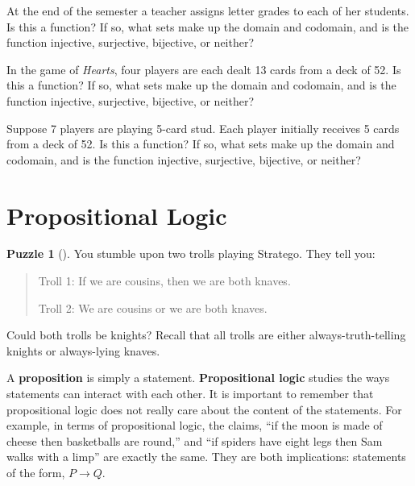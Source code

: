 \documentclass[10pt,]{book}
\newcommand{\terminology}[1]{\textbf{#1}}
\theoremstyle{plain}
\theoremstyle{definition}
\theoremstyle{definition}
\theoremstyle{definition}
\newtheorem{investigation}[project]{Puzzle}
\numberwithin{equation}{chapter}
\def\imp{\rightarrow}
\begin{document}
\begin{divisionexercise}{15}\hypertarget{exercise-148}{}
\hypertarget{p-2007}{}%
At the end of the semester a teacher assigns letter grades to each of her students. Is this a function? If so, what sets make up the domain and codomain, and is the function injective, surjective, bijective, or neither?%
\end{divisionexercise}%
\begin{divisionexercise}{16}\hypertarget{exercise-149}{}
\hypertarget{p-2009}{}%
In the game of \emph{Hearts}, four players are each dealt 13 cards from a deck of 52. Is this a function? If so, what sets make up the domain and codomain, and is the function injective, surjective, bijective, or neither?%
\end{divisionexercise}%
\begin{divisionexercise}{17}\hypertarget{exercise-150}{}
\hypertarget{p-2011}{}%
Suppose 7 players are playing 5-card stud. Each player initially receives 5 cards from a deck of 52. Is this a function? If so, what sets make up the domain and codomain, and is the function injective, surjective, bijective, or neither?%
\end{divisionexercise}%
\typeout{************************************************}
\typeout{************************************************}
\section[{Propositional Logic}]{Propositional Logic}\label{sec_background-logic}
\begin{investigation}[]\label{investigation-14}
\hypertarget{p-2013}{}%
You stumble upon two trolls playing Stratego\textregistered{}.  They tell you:%
\begin{quote}\hypertarget{blockquote-9}{}
\hypertarget{p-2014}{}%
Troll 1: If we are cousins, then we are both knaves.%
\par
\hypertarget{p-2015}{}%
Troll 2: We are cousins or we are both knaves.%
\end{quote}
\hypertarget{p-2016}{}%
Could both trolls be knights?  Recall that all trolls are either always-truth-telling knights or always-lying knaves.%
\end{investigation}
\hypertarget{p-2017}{}%
A \terminology{proposition} is simply a statement. \terminology{Propositional logic} studies the ways statements can interact with each other. It is important to remember that propositional logic does not really care about the content of the statements. For example, in terms of propositional logic, the claims, ``if the moon is made of cheese then basketballs are round,'' and ``if spiders have eight legs then Sam walks with a limp'' are exactly the same. They are both implications: statements of the form, \(P \imp Q\).%
\typeout{************************************************}
\typeout{************************************************}
\end{document}
